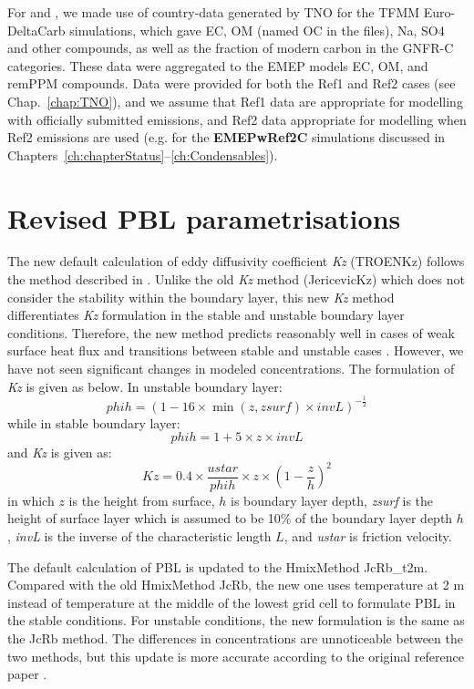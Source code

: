 
For \pmfine and \pmten, we made use of country-data generated by TNO for
the TFMM Euro-DeltaCarb simulations, which gave EC, OM (named
OC in the files), Na, SO4 and other compounds, as well as the fraction
of modern carbon in the GNFR-C categories. These data were aggregated
to the EMEP models EC, OM, and remPPM compounds. Data were provided for
both the Ref1 and Ref2 cases (see Chap.~\ref{chap:TNO}), and we assume
that Ref1 data are appropriate for modelling with officially submitted
emissions, and Ref2 data appropriate for modelling when Ref2 emissions
are used (e.g. for the \textbf{EMEPwRef2C} simulations discussed in
Chapters~\ref{ch:chapterStatus}--\ref{ch:Condensables}).



\section{Revised PBL parametrisations}
\label{sec:updateKz}

The new default calculation of eddy diffusivity coefficient \textit{Kz} (TROENKz) follows the method described in \citet{troenkz}. Unlike the old \textit{Kz} method (JericevicKz) which does not consider the stability within the boundary layer, this new \textit{Kz} method differentiates \textit{Kz} formulation in the stable and unstable boundary layer conditions. Therefore, the new method predicts reasonably well in cases of weak surface heat flux and transitions between stable and unstable cases \citep{troenkz}. However, we have not seen significant changes in modeled concentrations. The formulation of \textit{Kz} is given as below. In unstable boundary layer:
  $$\mathit{phih} = (1 - 16 \times \min(z, \mathit{zsurf}) \times \mathit{invL})^{-\frac 1 2}$$ 
while in stable boundary layer:
  $$\mathit{phih} = 1 + 5 \times z \times \mathit{invL}$$
and \textit{Kz} is given as:  
  $$\mathit{Kz} = 0.4 \times \frac{\mathit{ustar}}{\mathit{phih}} \times z \times (1 - \frac z h)^2$$
in which $z$ is the height from surface, $h$ is boundary layer depth, \textit{zsurf} is the height of surface layer which is assumed to be 10\% of the boundary layer depth $h$, \textit{invL} is the inverse of the characteristic length $L$, and \textit{ustar} is friction velocity. 

The default calculation of PBL is updated to the HmixMethod JcRb\_t2m. Compared with the old HmixMethod JcRb, the new one uses temperature at 2 m instead of temperature at the middle of the lowest grid cell to formulate PBL in the stable conditions. For unstable conditions, the new formulation is the same as the JcRb method. The differences in concentrations are unnoticeable between the two methods, but this update is more accurate according to the original reference paper \citep{JcRb}.  



